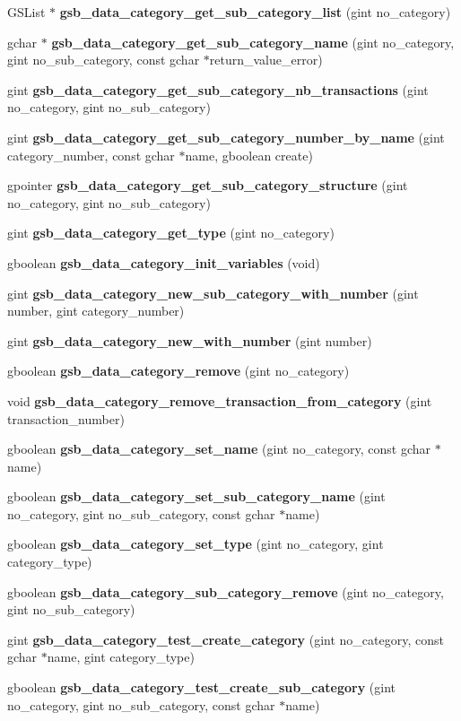 \begin{DoxyCompactItemize}
\item 
GSList $\ast$ {\bf gsb\_\-data\_\-category\_\-get\_\-sub\_\-category\_\-list} (gint no\_\-category)
\item 
gchar $\ast$ {\bf gsb\_\-data\_\-category\_\-get\_\-sub\_\-category\_\-name} (gint no\_\-category, gint no\_\-sub\_\-category, const gchar $\ast$return\_\-value\_\-error)
\item 
gint {\bf gsb\_\-data\_\-category\_\-get\_\-sub\_\-category\_\-nb\_\-transactions} (gint no\_\-category, gint no\_\-sub\_\-category)
\item 
gint {\bf gsb\_\-data\_\-category\_\-get\_\-sub\_\-category\_\-number\_\-by\_\-name} (gint category\_\-number, const gchar $\ast$name, gboolean create)
\item 
gpointer {\bf gsb\_\-data\_\-category\_\-get\_\-sub\_\-category\_\-structure} (gint no\_\-category, gint no\_\-sub\_\-category)
\item 
gint {\bf gsb\_\-data\_\-category\_\-get\_\-type} (gint no\_\-category)
\item 
gboolean {\bf gsb\_\-data\_\-category\_\-init\_\-variables} (void)
\item 
gint {\bf gsb\_\-data\_\-category\_\-new\_\-sub\_\-category\_\-with\_\-number} (gint number, gint category\_\-number)
\item 
gint {\bf gsb\_\-data\_\-category\_\-new\_\-with\_\-number} (gint number)
\item 
gboolean {\bf gsb\_\-data\_\-category\_\-remove} (gint no\_\-category)
\item 
void {\bf gsb\_\-data\_\-category\_\-remove\_\-transaction\_\-from\_\-category} (gint transaction\_\-number)
\item 
gboolean {\bf gsb\_\-data\_\-category\_\-set\_\-name} (gint no\_\-category, const gchar $\ast$name)
\item 
gboolean {\bf gsb\_\-data\_\-category\_\-set\_\-sub\_\-category\_\-name} (gint no\_\-category, gint no\_\-sub\_\-category, const gchar $\ast$name)
\item 
gboolean {\bf gsb\_\-data\_\-category\_\-set\_\-type} (gint no\_\-category, gint category\_\-type)
\item 
gboolean {\bf gsb\_\-data\_\-category\_\-sub\_\-category\_\-remove} (gint no\_\-category, gint no\_\-sub\_\-category)
\item 
gint {\bf gsb\_\-data\_\-category\_\-test\_\-create\_\-category} (gint no\_\-category, const gchar $\ast$name, gint category\_\-type)
\item 
gboolean {\bf gsb\_\-data\_\-category\_\-test\_\-create\_\-sub\_\-category} (gint no\_\-category, gint no\_\-sub\_\-category, const gchar $\ast$name)

\end{DoxyCompactItemize}
